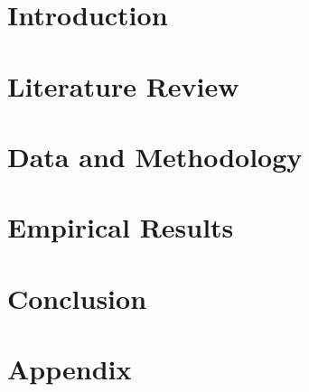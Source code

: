 \documentclass[12pt, oneside, letterpaper]{report}
\begin{document}



\section{Introduction}
\label{sec:p2_introduction}


\section{Literature Review}
\label{sec:p2_literature}


\section{Data and Methodology}
\label{sec:p2_data}


\section{Empirical Results}
\label{sec:p2_results}


\section{Conclusion}
\label{sec:p2_conclusion}


\clearpage
\begin{singlespace}

\end{singlespace}

\clearpage
\appendix
\section{Appendix}

\end{document}
